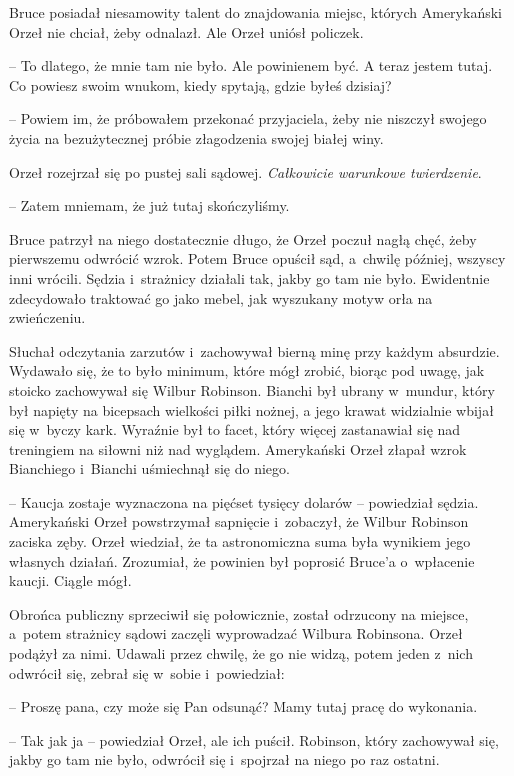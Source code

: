 \documentclass[oneside,polish,11pt,sfheadings]{mwbk}
\begin{document}
Bruce posiadał niesamowity talent do znajdowania miejsc, których
Amerykański Orzeł nie chciał, żeby odnalazł. Ale Orzeł uniósł policzek.

-- To dlatego, że mnie tam nie było. Ale powinienem być. A teraz jestem
tutaj. Co powiesz swoim wnukom, kiedy spytają, gdzie byłeś dzisiaj?

-- Powiem im, że próbowałem przekonać przyjaciela, żeby nie niszczył
swojego życia na bezużytecznej próbie złagodzenia swojej białej winy.

Orzeł rozejrzał się po pustej sali sądowej. \textit{Całkowicie warunkowe
twierdzenie}.

-- Zatem mniemam, że już tutaj skończyliśmy.

Bruce patrzył na niego dostatecznie długo, że Orzeł poczuł nagłą chęć,
żeby pierwszemu odwrócić wzrok. Potem Bruce opuścił sąd, a~chwilę
później, wszyscy inni wrócili. Sędzia i~strażnicy działali tak, jakby go
tam nie było. Ewidentnie zdecydowało traktować go jako mebel, jak
wyszukany motyw orła na zwieńczeniu.

Słuchał odczytania zarzutów i~zachowywał bierną minę przy każdym
absurdzie. Wydawało się, że to było minimum, które mógł zrobić, biorąc
pod uwagę, jak stoicko zachowywał się Wilbur Robinson. Bianchi był
ubrany w~mundur, który był napięty na bicepsach wielkości piłki nożnej,
a jego krawat widzialnie wbijał się w~byczy kark. Wyraźnie był to facet,
który więcej zastanawiał się nad treningiem na siłowni niż nad wyglądem.
Amerykański Orzeł złapał wzrok Bianchiego i~Bianchi uśmiechnął się do
niego.

-- Kaucja zostaje wyznaczona na pięćset tysięcy dolarów -- powiedział
sędzia. Amerykański Orzeł powstrzymał sapnięcie i~zobaczył, że Wilbur
Robinson zaciska zęby. Orzeł wiedział, że ta astronomiczna suma była
wynikiem jego własnych działań. Zrozumiał, że powinien był poprosić
Bruce'a o~wpłacenie kaucji. Ciągle mógł.

Obrońca publiczny sprzeciwił się połowicznie, został odrzucony na
miejsce, a~potem strażnicy sądowi zaczęli wyprowadzać Wilbura Robinsona.
Orzeł podążył za nimi. Udawali przez chwilę, że go nie widzą, potem
jeden z~nich odwrócił się, zebrał się w~sobie i~powiedział: 

-- Proszę
pana, czy może się Pan odsunąć? Mamy tutaj pracę do wykonania.

-- Tak jak ja -- powiedział Orzeł, ale ich puścił. Robinson, który
zachowywał się, jakby go tam nie było, odwrócił się i~spojrzał na niego
po raz ostatni.
\end{document}
